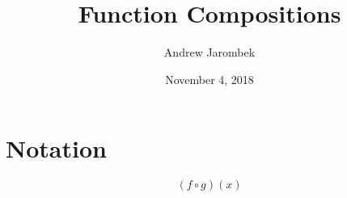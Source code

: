 \documentclass[a4paper, 12pt]{article}
\begin{document}
	
	\title{Function Compositions}
	\author{Andrew Jarombek}
	\date{November 4, 2018}
	\maketitle
	
	\section{Notation}
	
	$$
	(f \circ g)(x)
	$$
	
\end{document}
